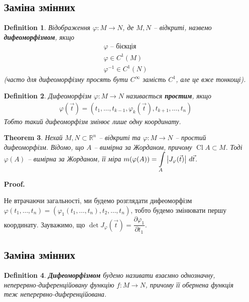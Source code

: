 \documentclass[a4paper, 10pt]{article}
\makeatletter
\def\departial#1#2{\dfrac{\partial {#1}}{\partial {#2}}}
\def\qed{$\blacksquare$}
\theoremstyle{theoremdd}
\newtheorem{theorem}{Theorem}[subsection]
\theoremstyle{theoremdd}
\newtheorem{definition}[theorem]{Definition}
\theoremstyle{theoremdd}
\theoremstyle{theoremdd}
\theoremstyle{theoremdd}
\theoremstyle{theoremdd}
\theoremstyle{theoremdd}
\theoremstyle{theoremdd}
\theoremstyle{theoremdd}
\theoremstyle{theoremdd}
\theoremstyle{theoremdd}
\theoremstyle{theoremdd}
\theoremstyle{theoremdd}
\theoremstyle{theoremdd}
\theoremstyle{theoremdd}
\renewenvironment{proof}[1][Proof.\\]{\par
\pushQED{\hfill \qed}%
\normalfont \topsep6\p@\@plus6\p@\relax
\trivlist
\item\relax
{\bfseries
#1\@addpunct{.}}\hspace\labelsep\ignorespaces
}{%
\popQED\endtrivlist\@endpefalse
}
\DeclareMathOperator{\Cl}{Cl}
\makeatother
\begin{document}
\subsection{Заміна змінних}
\begin{definition}
Відображення $\varphi \colon M \to N$, де $M,N$ -- відкриті, назвемо \textbf{дифеоморфізмом}, якщо
\begin{align*}
\varphi \text{ -- бієкція} \\
\varphi \in C^1(M) \\
\varphi^{-1} \in C^1(N)
\end{align*}
(часто для дифеоморфізму просять бути $C^\infty$ замість $C^1$, але це вже тонкощі).
\end{definition}

\begin{definition}
Дифеоморфізм $\varphi \colon M \to N$ називається \textbf{простим}, якщо
\begin{align*}
\varphi(\vec{t}) = (t_1,\dots,t_{k-1}, \varphi_k(\vec{t}), t_{k+1}, \dots, t_n)
\end{align*}
Тобто такий дифеоморфізм змінює лише одну координату.
\end{definition}

\begin{theorem}
Нехай $M,N \subset \mathbb{R}^n$ -- відкриті та $\varphi \colon M \to N$ -- простий дифеоморфізм. Відомо, що $A$ -- вимірна за Жорданом, причому $\Cl A \subset M$. Тоді $\varphi(A)$ -- вимірна за Жорданом, її міра $m(\varphi(A)) = \displaystyle\int\displaylimits_A \left| J_\varphi(\vec{t}) \right|\,d\vec{t}$.
\end{theorem}

\begin{proof}
Не втрачаючи загальності, ми будемо розглядати дифеоморфізм $\varphi(t_1,\dots,t_n) = (\varphi_1(t_1,\dots,t_n), t_2,\dots,t_n)$, тобто будемо змінювати першу координату. Зауважимо, що $\det J_\varphi(\vec{t}) = \departial{\varphi_1}{t_1}$.
\end{proof}

\subsection{Заміна змінних}
\iffalse
\begin{definition}
\textbf{Дифеоморфізмом} будемо називати взаємно однозначну, неперервно-диференційовану функцію $f: M \to N$, причому її обернена функція теж неперервно-диференційована.
\end{definition}
\end{document}
